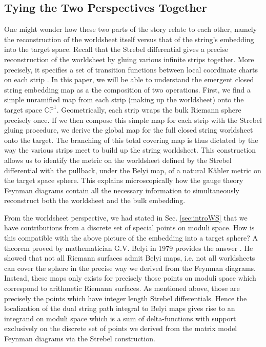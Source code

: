 \documentclass[english]{article}
\renewcommand{\>}{\rangle}
\newcommand{\<}{\langle}
\renewcommand{\(}{\left(}
\renewcommand{\)}{\right)}
\begin{document}
\subsection{Tying the Two Perspectives Together}

One might wonder how these two parts of the story relate to each other, namely the reconstruction of the worldsheet itself versus that of the string's embedding into the target space. Recall that the Strebel differential gives a precise reconstruction of the worldsheet by gluing various infinite strips together. More precisely, it specifies a set of transition functions between local coordinate charts on each strip \cite{mulase1998ribbon,mulaseStrebel}. In this paper, we will be able to understand the emergent closed string embedding map as a the composition of two operations. First, we find a simple unramified map from each strip (making up the worldsheet) onto the target space $\mathbb{CP}^{1}$. Geometrically, each strip wraps the bulk Riemann sphere precisely once. If we then compose this simple map for each strip with the Strebel gluing procedure, we derive the global map for the full closed string worldsheet onto the target. The branching of this total covering map is thus dictated by the way the various strips meet to build up the string worldsheet. This construction allows us to identify the metric on the worldsheet defined by the Strebel differential with the pullback, under the Belyi map, of a natural Kähler metric on the target space sphere. This explains microscopically how the gauge theory Feynman diagrams contain all the necessary information to simultaneously reconstruct both the worldsheet and the bulk embedding. 

From the worldsheet perspective, we had stated in Sec. \ref{sec:introWS} that we have contributions from a discrete set of special points on moduli space. How is this compatible with the above picture of the embedding into a target sphere? A theorem proved by mathematician G.V. Belyi in 1979 provides the answer \cite{zbMATH03668723}. He showed that not all Riemann surfaces admit Belyi maps, i.e. not all worldsheets can cover the sphere in the precise way we derived from the Feynman diagrams. Instead, these maps only exists for precisely those points on moduli space which correspond to arithmetic Riemann surfaces. As mentioned above, those are precisely the points which have integer length Strebel differentials. Hence the localization of the dual string path integral to Belyi maps gives rise to an integrand on moduli space which is a sum of delta-functions with support exclusively on the discrete set of points we derived from the matrix model Feynman diagrams via the Strebel construction.
\end{document}
